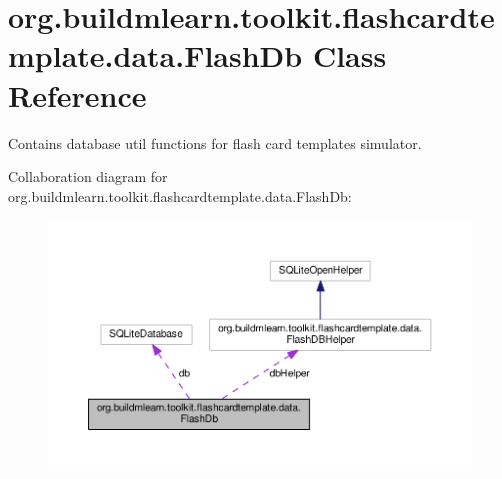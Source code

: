 \hypertarget{classorg_1_1buildmlearn_1_1toolkit_1_1flashcardtemplate_1_1data_1_1FlashDb}{}\section{org.\+buildmlearn.\+toolkit.\+flashcardtemplate.\+data.\+Flash\+Db Class Reference}
\label{classorg_1_1buildmlearn_1_1toolkit_1_1flashcardtemplate_1_1data_1_1FlashDb}


Contains database util functions for flash card template\textquotesingle{}s simulator.  




Collaboration diagram for org.\+buildmlearn.\+toolkit.\+flashcardtemplate.\+data.\+Flash\+Db\+:
\nopagebreak
\begin{figure}[H]
\begin{center}
\leavevmode
\includegraphics[width=350pt]{classorg_1_1buildmlearn_1_1toolkit_1_1flashcardtemplate_1_1data_1_1FlashDb__coll__graph}
\end{center}
\end{figure}
